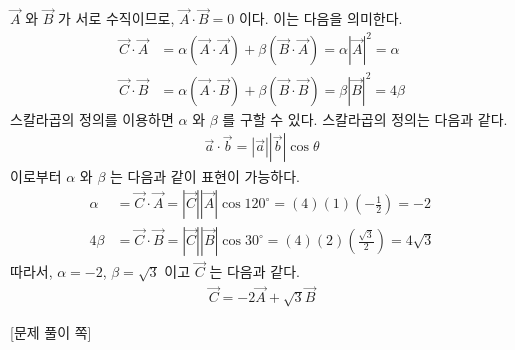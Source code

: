 \documentclass[APS,floatfix,nofootinbib,superscriptaddress,fleqn,preprint]{revtex4}
\begin{document}
 $\vec{A}$ 와 $\vec{B}$ 가 서로 수직이므로, $\vec{A} \cdot \vec{B} =0 $ 이다. 이는 다음을 의미한다.
\begin{align*}
  \vec{C} \cdot \vec{A} &= \alpha(\vec{A}\cdot\vec{A})+\beta(\vec{B}\cdot\vec{A}) = \alpha|\vec{A}|^2=\alpha \\
  \vec{C} \cdot \vec{B} &= \alpha(\vec{A}\cdot\vec{B})+\beta(\vec{B}\cdot\vec{B}) =\beta|\vec{B}|^2=4\beta 
\end{align*}
스칼라곱의 정의를 이용하면 $\alpha$ 와 $\beta$ 를 구할 수 있다. 스칼라곱의 정의는 다음과 같다.
\begin{align*}
  \vec{a} \cdot \vec{b} = |\vec{a}||\vec{b}|\cos{\theta}
\end{align*}
이로부터 $\alpha$ 와 $\beta$ 는 다음과 같이 표현이 가능하다.
\begin{align*}
  \alpha &= \vec{C} \cdot \vec{A} =|\vec{C}||\vec{A}|\cos{120^{\circ}} = (4) (1) \left(-\frac{1}{2}\right) = -2 \\
  4\beta &= \vec{C} \cdot \vec{B} =|\vec{C}||\vec{B}|\cos{30^{\circ}} = (4) (2)\left(\frac{\sqrt{3}}{2}\right) = 4\sqrt{3}
\end{align*}
따라서, $\alpha = -2$, $\beta = \sqrt{3}$ 이고 $\vec{C}$ 는 다음과 같다.
\begin{align*}
  \vec{C} = -2 \vec{A} + \sqrt{3} \vec{B}
\end{align*}
\newpage

{\color{gray} [문제 풀이 쪽]}

\newpage 
\end{document}
